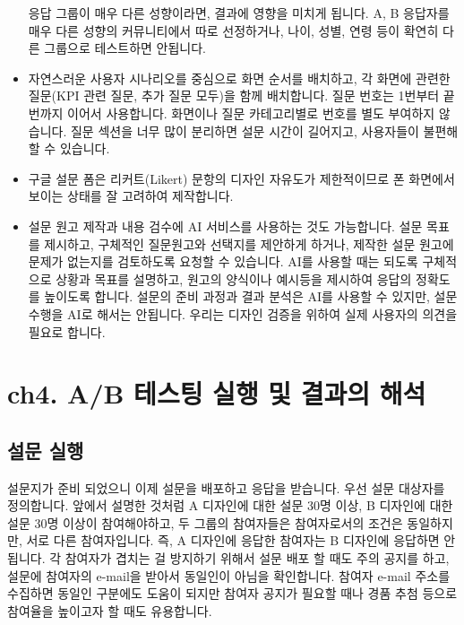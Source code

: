 \documentclass[
  letterpaper,
]{book}
\begin{document}
\begin{itemize}
  응답 그룹이 매우 다른 성향이라면, 결과에 영향을 미치게 됩니다. A, B
  응답자를 매우 다른 성향의 커뮤니티에서 따로 선정하거나, 나이, 성별,
  연령 등이 확연히 다른 그룹으로 테스트하면 안됩니다.
\item
  자연스러운 사용자 시나리오를 중심으로 화면 순서를 배치하고, 각 화면에
  관련한 질문(KPI 관련 질문, 추가 질문 모두)을 함께 배치합니다. 질문
  번호는 1번부터 끝번까지 이어서 사용합니다. 화면이나 질문 카테고리별로
  번호를 별도 부여하지 않습니다. 질문 섹션을 너무 많이 분리하면 설문
  시간이 길어지고, 사용자들이 불편해할 수 있습니다.
\item
  구글 설문 폼은 리커트(Likert) 문항의 디자인 자유도가 제한적이므로 폰
  화면에서 보이는 상태를 잘 고려하여 제작합니다.
\item
  설문 원고 제작과 내용 검수에 AI 서비스를 사용하는 것도 가능합니다.
  설문 목표를 제시하고, 구체적인 질문원고와 선택지를 제안하게 하거나,
  제작한 설문 원고에 문제가 없는지를 검토하도록 요청할 수 있습니다. AI를
  사용할 때는 되도록 구체적으로 상황과 목표를 설명하고, 원고의 양식이나
  예시등을 제시하여 응답의 정확도를 높이도록 합니다. 설문의 준비 과정과
  결과 분석은 AI를 사용할 수 있지만, 설문 수행을 AI로 해서는 안됩니다.
  우리는 디자인 검증을 위하여 실제 사용자의 의견을 필요로 합니다.
\end{itemize}

\chapter{ch4. A/B 테스팅 실행 및 결과의
해석}\label{ch4.-ab-uxd14cuxc2a4uxd305-uxc2e4uxd589-uxbc0f-uxacb0uxacfcuxc758-uxd574uxc11d}

\section{설문 실행}\label{uxc124uxbb38-uxc2e4uxd589}

설문지가 준비 되었으니 이제 설문을 배포하고 응답을 받습니다. 우선 설문
대상자를 정의합니다. 앞에서 설명한 것처럼 A 디자인에 대한 설문 30명
이상, B 디자인에 대한 설문 30명 이상이 참여해야하고, 두 그룹의
참여자들은 참여자로서의 조건은 동일하지만, 서로 다른 참여자입니다. 즉, A
디자인에 응답한 참여자는 B 디자인에 응답하면 안됩니다. 각 참여자가
겹치는 걸 방지하기 위해서 설문 배포 할 때도 주의 공지를 하고, 설문에
참여자의 e-mail을 받아서 동일인이 아님을 확인합니다. 참여자 e-mail
주소를 수집하면 동일인 구분에도 도움이 되지만 참여자 공지가 필요할 때나
경품 추첨 등으로 참여율을 높이고자 할 때도 유용합니다.
\end{document}
